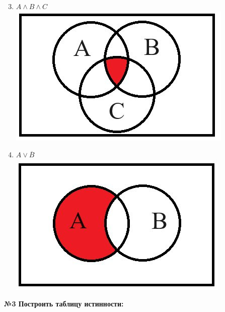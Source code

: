     \begin{minipage}[t]{0.4\textwidth}
        \centering
        \begin{enumerate}
            \setcounter{enumi}{2}
            \item $A \wedge B \wedge C$\\
            \includegraphics[width=1\linewidth]{images/im3}

            \item $A \vee \overline B$\\
            \includegraphics[width=1\linewidth]{images/im4}

        \end{enumerate}
    \end{minipage}

    \begin{center}
        \textbf{№3 Построить таблицу истинности:}
    \end{center}

